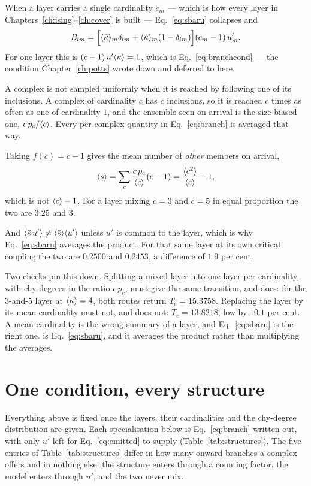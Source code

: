 When a layer carries a single cardinality $c_{m}$ --- which is how every layer
in Chapters~\ref{ch:ising}--\ref{ch:cover} is built ---
Eq.~\eqref{eq:sbaru} collapses and
\begin{equation}
  B_{lm}=\Bigl[\langle \bar\kappa \rangle_{m}\delta_{lm}
              +\langle \kappa \rangle_{m}(1-\delta_{lm})\Bigr](c_{m}-1)\,u'_{m}.
  \label{eq:branchsingle}
\end{equation}
For one layer this is $(c-1)\,u'\langle \bar\kappa \rangle=1$, which is
Eq.~\eqref{eq:branchcond} --- the condition Chapter~\ref{ch:potts} wrote down
and deferred to here.

A complex is not sampled uniformly when it is reached by following one of its
inclusions. A complex of cardinality $c$ has $c$ inclusions, so it is reached
$c$ times as often as one of cardinality $1$, and the ensemble seen on arrival
is the size-biased one, $c\,p_{c}/\langle c \rangle$. Every per-complex quantity in
Eq.~\eqref{eq:branch} is averaged that way.

Taking $f(c)=c-1$ gives the mean number of \emph{other} members on arrival,
\[
  \langle \bar s \rangle=\sum_{c}\frac{c\,p_{c}}{\langle c \rangle}(c-1)
             =\frac{\langle c^{2} \rangle}{\langle c \rangle}-1,
\]
which is not $\langle c \rangle-1$. For a layer mixing $c=3$ and $c=5$ in equal
proportion the two are $3.25$ and $3$.

And $\langle \bar s\,u' \rangle\ne\langle \bar s \rangle\langle u' \rangle$ unless $u'$ is common to the layer,
which is why Eq.~\eqref{eq:sbaru} averages the product. For that same layer at
its own critical coupling the two are $0.2500$ and $0.2453$, a difference of
$1.9$ per cent.

Two checks pin this down. Splitting a mixed layer into one layer per
cardinality, with chy-degrees in the ratio $c\,p_{c}$, must give the same
transition, and does: for the $3$-and-$5$ layer at $\langle \kappa \rangle=4$, both routes
return $T_{c}=15.3758$. Replacing the layer by its mean cardinality must not,
and does not: $T_{c}=13.8218$, low by $10.1$ per cent. A mean cardinality is the wrong
summary of a layer, and Eq.~\eqref{eq:sbaru} is the right one.  is Eq.~\eqref{eq:sbaru}, and it averages the product rather than multiplying the averages.

\section{One condition, every structure}
\label{sec:structures}

Everything above is fixed once the layers, their cardinalities and the
chy-degree distribution are given. Each specialisation below is
Eq.~\eqref{eq:branch} written out, with only $u'$ left for
Eq.~\eqref{eq:emitted} to supply (Table~\ref{tab:structures}). The five entries
of Table~\ref{tab:structures} differ in how many onward branches a complex
offers and in nothing else: the structure enters through a counting factor, the
model enters through $u'$, and the two never mix.

